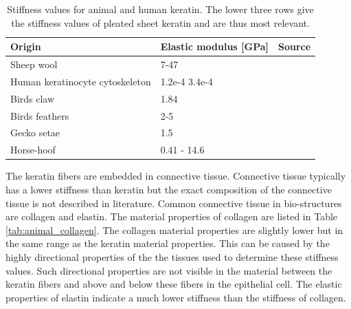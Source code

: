   
\begin{table}[h!]
\centering
\begin{tabular}{p{3cm}|p{2.5cm}|p{1cm}}
Origin                          & Elastic modulus [GPa]& Source                 \\
\hline
Sheep wool                      & 7-47              & \cite{simpson196551}\\
Human keratinocyte cytoskeleton & 1.2e-4 3.4e-4     & \cite{lulevich2010single}\\
Birds claw                      & 1.84              & \cite{bonser2000young}\\
Birds feathers                  & 2-5               & \cite{cameron2003young}\\
Gecko setae                     & 1.5               & \cite{peattie2007ancestrally}\\
Horse-hoof                      & 0.41 - 14.6       & \cite{bertram1987functional}
\end{tabular}
\caption{Stiffness values for animal and human keratin. The lower three rows give the stiffness values of pleated sheet keratin and are thus most relevant.}
\label{tab:animal_keratin}
\end{table}
  

\qquad The keratin fibers are embedded in connective tissue. Connective tissue typically has a lower stiffness than keratin but the exact composition of the connective tissue is not described in literature. Common connective tissue in bio-structures are collagen and elastin. The material properties of collagen are listed in Table \ref{tab:animal_collagen}. The collagen material properties are slightly lower but in the same range as the keratin material properties. This can be caused by the highly directional properties of the the tissues used to determine these stiffness values. Such directional properties are not visible in the material between the keratin fibers and above and below these fibers in the epithelial cell. The elastic properties of elastin indicate a much lower stiffness than the stiffness of collagen.\\ 

